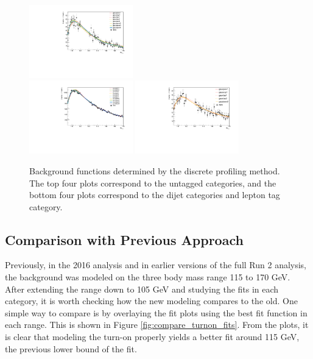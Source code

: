 \begin{figure}
\begin{center}
        \includegraphics[width=0.4\textwidth]{fig/envelope_plots/m105_170_cat502_turn_lau.pdf}\\
        \includegraphics[width=0.4\textwidth]{fig/envelope_plots/m105_170_cat503_turn_bern5.pdf}
        \includegraphics[width=0.4\textwidth]{fig/envelope_plots/m105_170_cat6789_turn_lau.pdf}
		\caption{Background functions determined by the discrete profiling method.
        The top four plots correspond to the untagged categories, and the bottom four plots correspond to the dijet categories and lepton tag category.}
		\label{fig:bkgmodel_e}
	\end{center}
\end{figure}

\subsection{Comparison with Previous Approach}
Previously, in the 2016 analysis and in earlier versions of the full Run 2 analysis, 
the background was modeled on the three body mass range 115 to 170 GeV. After extending the 
range down to 105 GeV and studying the fits in each category, it is worth checking how the new
modeling compares to the old. One simple way to compare is by overlaying the fit plots using 
the best fit function in each range. This is shown in Figure \ref{fig:compare_turnon_fits}. From the plots, 
it is clear that modeling the turn-on properly yields a better fit around 115 GeV, the previous lower bound of the fit. 


